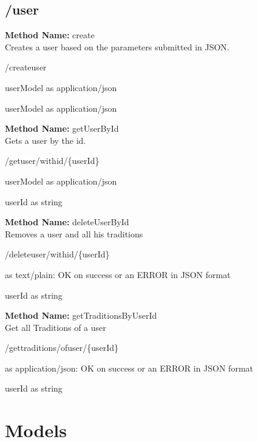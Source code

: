 \section{/user}
\textbf{Method Name: }create \\ Creates a user based on the parameters submitted in JSON.
\begin{post}
/createuser
\end{post}
\begin{request}
userModel as application/json
\end{request}
\begin{response}
userModel as application/json
\end{response}
\textbf{Method Name: }getUserById \\ Gets a user by the id.
\begin{get}
/getuser/withid/\{userId\}
\end{get}
\begin{response}
userModel as application/json
\end{response}
\begin{parameter}
userId as string
\end{parameter}
\textbf{Method Name: }deleteUserById \\ Removes a user and all his traditions
\begin{delete}
/deleteuser/withid/\{userId\}
\end{delete}
\begin{response}
 as text/plain: OK on success or an ERROR in JSON format
\end{response}
\begin{parameter}
userId as string
\end{parameter}
\textbf{Method Name: }getTraditionsByUserId \\ Get all Traditions of a user
\begin{get}
/gettraditions/ofuser/\{userId\}
\end{get}
\begin{response}
 as application/json: OK on success or an ERROR in JSON format
\end{response}
\begin{parameter}
userId as string
\end{parameter}



\chapter{Models}


